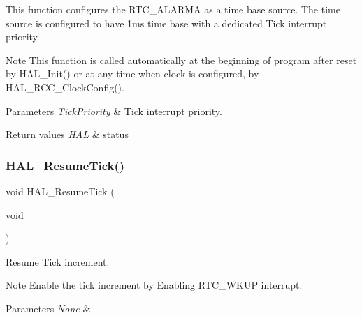 This function configures the R\+T\+C\+\_\+\+A\+L\+A\+R\+MA as a time base source. The time source is configured to have 1ms time base with a dedicated Tick interrupt priority.

\begin{DoxyNote}{Note}
This function is called automatically at the beginning of program after reset by H\+A\+L\+\_\+\+Init() or at any time when clock is configured, by H\+A\+L\+\_\+\+R\+C\+C\+\_\+\+Clock\+Config(). 
\end{DoxyNote}

\begin{DoxyParams}{Parameters}
{\em Tick\+Priority} & Tick interrupt priority. \\
\hline
\end{DoxyParams}

\begin{DoxyRetVals}{Return values}
{\em H\+AL} & status \\
\hline
\end{DoxyRetVals}
\mbox{\label{group___h_a_l___time_base___r_t_c___wake_up___template_ga24e0ee9dae1ec0f9d19200f5575ff790}} 
\subsubsection{\texorpdfstring{H\+A\+L\+\_\+\+Resume\+Tick()}{HAL\_ResumeTick()}}
{\footnotesize\ttfamily void H\+A\+L\+\_\+\+Resume\+Tick (\begin{DoxyParamCaption}\item[{void}]{ }\end{DoxyParamCaption})}



Resume Tick increment. 

\begin{DoxyNote}{Note}
Enable the tick increment by Enabling R\+T\+C\+\_\+\+W\+K\+UP interrupt. 
\end{DoxyNote}

\begin{DoxyParams}{Parameters}
{\em None} & \\
\hline
\end{DoxyParams}

